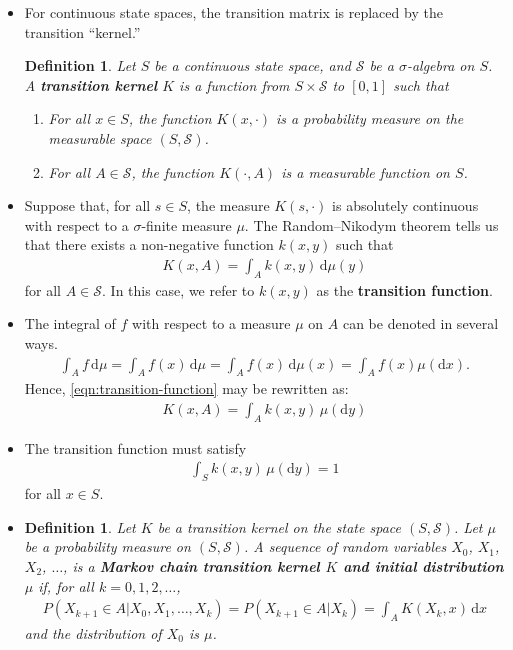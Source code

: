 \documentclass[10pt]{article}
\newtheorem{definition}[lemma]{Definition}
\newcommand{\dee}{\mathrm{d}}
\newcommand{\mcal}[1]{\mathcal{#1}}
\begin{document}
\begin{itemize}
  \item For continuous state spaces, the transition matrix is replaced by the transition ``kernel.''
  
  \begin{definition}
    Let $S$ be a continuous state space, and $\mcal{S}$ be a $\sigma$-algebra on $S$. A {\bf transition kernel} $K$ is a function from $S \times \mcal{S}$ to $[0,1]$ such that
    \begin{enumerate}
      \item For all $x \in S$, the function $K(x,\cdot)$ is a probability measure on the measurable space $(S, \mcal{S})$.
      \item For all $A \in \mcal{S}$, the function $K(\cdot, A)$ is a measurable function on $S$.
    \end{enumerate}
  \end{definition}

  \item Suppose that, for all $s \in S$, the measure $K(s,\cdot)$ is absolutely continuous with respect to a $\sigma$-finite measure $\mu$. The Random--Nikodym theorem tells us that there exists a non-negative function $k(x,y)$ such that
  \begin{align}
    K(x,A) = \int_A k(x,y)\, \dee \mu(y) \label{eqn:transition-function}
  \end{align}
  for all $A \in \mcal{S}$. In this case, we refer to $k(x,y)$ as the {\bf transition function}.

  \item The integral of $f$ with respect to a measure $\mu$ on $A$ can be denoted in several ways.
  \begin{align*}
    \int_A f\, \dee\mu
    = \int_A f(x)\, \dee\mu
    = \int_A f(x)\, \dee\mu(x)
    = \int_A f(x)\mu(\dee x).
  \end{align*}  
  Hence, \eqref{eqn:transition-function} may be rewritten as:
  \begin{align*}
    K(x,A) = \int_A k(x,y)\, \mu(\dee y)
  \end{align*}

  \item The transition function must satisfy
  \begin{align*}
    \int_S k(x,y)\, \mu(\dee y) = 1
  \end{align*}
  for all $x \in S$.

  \item \begin{definition}
    Let $K$ be a transition kernel on the state space $(S, \mcal{S})$. Let $\mu$ be a probability measure on $(S, \mcal{S})$. A sequence of random variables $X_0$, $X_1$, $X_2$, $\dotsc$, is a {\bf Markov chain transition kernel $K$ and initial distribution $\mu$} if, for all $k = 0, 1, 2, \dotsc$,
    \begin{align*}
      P(X_{k+1} \in A | X_0, X_1, \dotsc, X_k) = P(X_{k+1} \in A | X_k) = \int_A K(X_k, x)\, \dee x
    \end{align*}
    and the distribution of $X_0$ is $\mu$.
  \end{definition}


\end{itemize}
\end{document}
